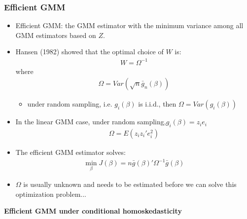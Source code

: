 \documentclass[a4paper,twoside,11pt]{article}
\begin{document}
\subsubsection{Efficient GMM}
\begin{itemize}
    \item Efficient GMM: the GMM estimator with the minimum variance among all GMM estimators based on $Z$.
    \item Hansen (1982) showed that the optimal choice of $W$ is:
\begin{equation*}
\begin{aligned}
W = \Omega^{-1}
\end{aligned} 
\end{equation*}
where
\begin{equation*}
\begin{aligned}
\Omega = Var(\sqrt{n} \bar g_n (\beta))
\end{aligned} 
\end{equation*}
    \begin{itemize}
        \item under random sampling, i.e. $g_i(\beta)$ is i.i.d., then $\Omega = Var(g_i (\beta))$
    \end{itemize}
    \item In the linear GMM case, under random sampling,$g_i(\beta) = z_ie_i$
\begin{equation*}
\begin{aligned}
\Omega = E(z_i z_i' e_i^2)
\end{aligned} 
\end{equation*}
    \item The efficient GMM estimator solves:
\begin{equation*}
\begin{aligned}
\underset{\beta}{\min} J(\beta) = n \bar g(\beta)' \Omega^{-1} \bar g(\beta)
\end{aligned} 
\end{equation*}
    \item $\Omega$ is usually unknown and needs to be estimated before we can solve this optimization problem...
\end{itemize}
\textbf{Efficient GMM under conditional homoskedasticity}
\end{document}
